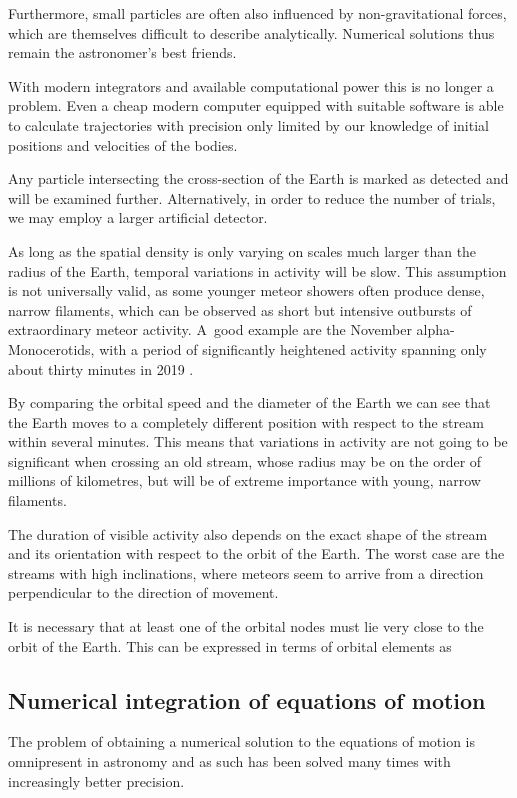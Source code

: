         Furthermore, small particles are often also influenced by non-gravitational forces,
        which are themselves difficult to describe analytically.
        Numerical solutions thus remain the astronomer's best friends.

        With modern integrators and available computational power this is no longer a problem.
        Even a cheap modern computer equipped with suitable software is able to calculate trajectories
        with precision only limited by our knowledge of initial positions and velocities of the bodies.


    Any particle intersecting the cross-section of the Earth is marked as detected and will be examined further.
    Alternatively, in order to reduce the number of trials, we may employ a larger artificial detector.


    As long as the spatial density is only varying on scales much larger than the radius of the Earth,
    temporal variations in activity will be slow.
    This assumption is not universally valid, as some younger meteor showers often produce dense, narrow filaments,
    which can be observed as short but intensive outbursts of extraordinary meteor activity.
    A~good example are the November alpha-Monocerotids, with a period of significantly
    heightened activity spanning only about thirty minutes in 2019 \citep{CBET4692}.

    By comparing the orbital speed and the diameter of the Earth we can see that the Earth moves
    to a completely different position with respect to the stream within several minutes.
    This means that variations in activity are not going to be significant when crossing an old stream,
    whose radius may be on the order of millions of kilometres, but will be of extreme importance with young, narrow filaments.

    The duration of visible activity also depends on the exact shape of the stream and its orientation with respect to the orbit of the Earth.
    The worst case are the streams with high inclinations, where meteors seem to arrive from a direction perpendicular
    to the direction of movement.



    It is necessary that at least one of the orbital nodes must lie very close to the orbit of the Earth.
    This can be expressed in terms of orbital elements as


    \subsection{Numerical integration of equations of motion} \label{msi}
        The problem of obtaining a numerical solution to the equations of motion is omnipresent
        in astronomy and as such has been solved many times with increasingly better precision.

